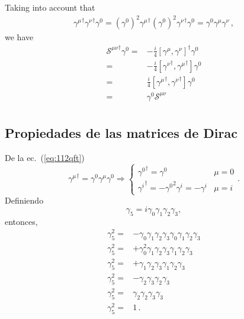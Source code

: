 Taking into account that
\begin{align}
  {\gamma^\mu}^\dagger{\gamma^\nu}^\dagger\gamma^0=\left(\gamma^0\right)^2{\gamma^\mu}^\dagger\left(\gamma^0\right)^2{\gamma^\nu}^\dagger\gamma^0=\gamma^0\gamma^\mu\gamma^\nu\,,
\end{align}
we have
\begin{align}
  {\mathcal{S}^{\mu\nu}}^\dagger \gamma^0=&-\frac{i}{4}\left[\gamma^\mu,\gamma^\nu\right]^\dagger\gamma^0\nonumber\\
=&-\frac{i}{4}\left[{\gamma^\nu}^\dagger,{\gamma^\mu}^\dagger\right]\gamma^0\nonumber\\
=&\frac{i}{4}\left[{\gamma^\mu}^\dagger,{\gamma^\nu}^\dagger\right]\gamma^0\nonumber\\
=&\gamma^0\mathcal{S}^{\mu\nu}\nonumber\\
\end{align}


\subsection{Propiedades de las matrices de Dirac}
\label{sec:propiedades-de-las}
De la ec.~(\ref{eq:112qft})
\begin{equation}
  {\gamma^\mu}^\dagger=\gamma^0\gamma^\mu\gamma^0\Rightarrow  
  \begin{cases}
    {\gamma^0}^\dagger=\gamma^0&\mu=0\\
    {\gamma^i}^\dagger=-{\gamma^0}^2\gamma^i=-\gamma^i&\mu=i
  \end{cases}.
\end{equation}
Definiendo
\begin{equation}
\label{eq:117qft}
  \gamma_5=i\gamma_0\gamma_1\gamma_2\gamma_3,
\end{equation}
entonces,
\begin{align}
  \gamma_5^2=&-\gamma_0\gamma_1\gamma_2\gamma_3\gamma_0\gamma_1\gamma_2\gamma_3\nonumber\\
  \gamma_5^2=&+\gamma_0^2\gamma_1\gamma_2\gamma_3\gamma_1\gamma_2\gamma_3\nonumber\\
  \gamma_5^2=&+\gamma_1\gamma_2\gamma_3\gamma_1\gamma_2\gamma_3\nonumber\\
  \gamma_5^2=&-\gamma_2\gamma_3\gamma_2\gamma_3\nonumber\\
  \gamma_5^2=&\gamma_2\gamma_2\gamma_3\gamma_3\nonumber\\
  \gamma_5^2=&1\,.
\end{align}

